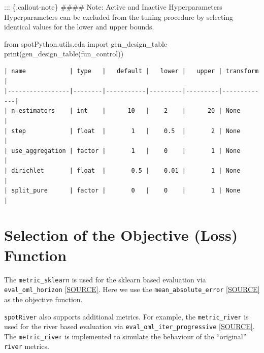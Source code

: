 \documentclass[
  letterpaper,
  DIV=11,
  numbers=noendperiod]{scrreprt}
\newenvironment{Shaded}{\begin{snugshade}}{\end{snugshade}}
\newcommand{\BuiltInTok}[1]{\textcolor[rgb]{0.00,0.23,0.31}{#1}}
\newcommand{\ImportTok}[1]{\textcolor[rgb]{0.00,0.46,0.62}{#1}}
\newcommand{\NormalTok}[1]{\textcolor[rgb]{0.00,0.23,0.31}{#1}}
\begin{document}
::: \{.callout-note\} \#\#\#\# Note: Active and Inactive Hyperparameters
Hyperparameters can be excluded from the tuning procedure by selecting
identical values for the lower and upper bounds.

\begin{Shaded}
\begin{Highlighting}[]
\ImportTok{from}\NormalTok{ spotPython.utils.eda }\ImportTok{import}\NormalTok{ gen\_design\_table}
\BuiltInTok{print}\NormalTok{(gen\_design\_table(fun\_control))}
\end{Highlighting}
\end{Shaded}

\begin{verbatim}
| name            | type   |   default |   lower |   upper | transform   |
|-----------------|--------|-----------|---------|---------|-------------|
| n_estimators    | int    |      10   |    2    |      20 | None        |
| step            | float  |       1   |    0.5  |       2 | None        |
| use_aggregation | factor |       1   |    0    |       1 | None        |
| dirichlet       | float  |       0.5 |    0.01 |       1 | None        |
| split_pure      | factor |       0   |    0    |       1 | None        |
\end{verbatim}

\hypertarget{selection-of-the-objective-loss-function-2}{%
\section{Selection of the Objective (Loss)
Function}\label{selection-of-the-objective-loss-function-2}}

The \texttt{metric\_sklearn} is used for the sklearn based evaluation
via \texttt{eval\_oml\_horizon}
\href{https://github.com/sequential-parameter-optimization/spotRiver/blob/main/src/spotRiver/evaluation/eval_bml.py}{{[}SOURCE{]}}.
Here we use the \texttt{mean\_absolute\_error}
\href{https://scikit-learn.org/stable/modules/generated/sklearn.metrics.mean_absolute_error.html}{{[}SOURCE{]}}
as the objective function.

\begin{tcolorbox}[enhanced jigsaw, left=2mm, toprule=.15mm, colframe=quarto-callout-note-color-frame, leftrule=.75mm, title=\textcolor{quarto-callout-note-color}{\faInfo}\hspace{0.5em}{Note: Additional metrics}, toptitle=1mm, opacitybacktitle=0.6, arc=.35mm, titlerule=0mm, opacityback=0, bottomtitle=1mm, coltitle=black, rightrule=.15mm, colback=white, colbacktitle=quarto-callout-note-color!10!white, breakable, bottomrule=.15mm]

\texttt{spotRiver} also supports additional metrics. For example, the
\texttt{metric\_river} is used for the river based evaluation via
\texttt{eval\_oml\_iter\_progressive}
\href{https://github.com/sequential-parameter-optimization/spotRiver/blob/main/src/spotRiver/evaluation/eval_oml.py}{{[}SOURCE{]}}.
The \texttt{metric\_river} is implemented to simulate the behaviour of
the ``original'' \texttt{river} metrics.

\end{tcolorbox}
\end{document}
